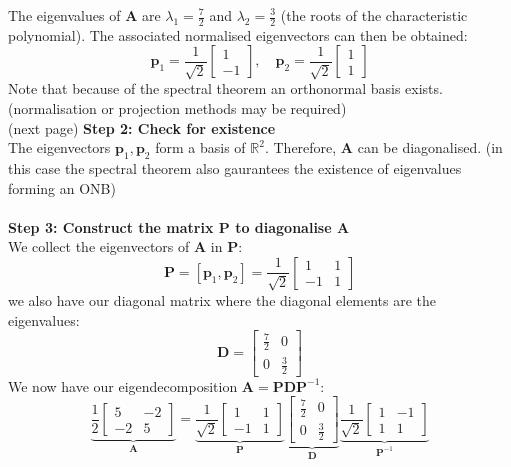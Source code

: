 \documentclass{report}
\begin{document}
The eigenvalues of $\bm{A}$ are $\lambda_1=\frac{7}{2}$ and $\lambda_2=\frac{3}{2}$ (the roots of the characteristic
polynomial). The associated normalised eigenvectors can then be obtained:
\begin{equation*}
\bm{p}_1=\frac{1}{\sqrt{2}}\begin{bmatrix}1\\-1\end{bmatrix},\quad
\bm{p}_2=\frac{1}{\sqrt{2}}\begin{bmatrix}1\\1\end{bmatrix}
\end{equation*}
Note that because of the spectral theorem an orthonormal basis exists. (normalisation or projection methods
may be required)\\
(next page)
\newpage
\noindent\textbf{Step 2: Check for existence}\\
The eigenvectors $\bm{p}_1,\bm{p}_2$ form a basis of 
$\mathbb{R}^2$. Therefore, $\bm{A}$ can be diagonalised.
(in this case the spectral theorem also gaurantees the existence of eigenvalues forming an ONB)\\
\vspace{1mm}\\
\textbf{Step 3: Construct the matrix $\bm{P}$ to diagonalise $\bm{A}$}\\
We collect the eigenvectors of $\bm{A}$ in $\bm{P}$:
\begin{equation*}
\bm{P}=[\bm{p}_1,\bm{p}_2]=\frac{1}{\sqrt{2}}
\begin{bmatrix}
1&1\\-1&1\end{bmatrix}
\end{equation*}
we also have our diagonal matrix where the diagonal elements are the eigenvalues:
\begin{equation*}
\bm{D}=\begin{bmatrix}
\frac{7}{2}&0\\0&\frac{3}{2}\end{bmatrix}
\end{equation*}
We now have our eigendecomposition $\bm{A}=\bm{PDP}^{-1}$:
\begin{equation*}
\underbrace{\frac{1}{2}\begin{bmatrix}5&-2\\-2&5\end{bmatrix}}_{\bm{A}}
=\underbrace{\frac{1}{\sqrt{2}}\begin{bmatrix}1&1\\-1&1\end{bmatrix}}_{\bm{P}}
\underbrace{\begin{bmatrix}\frac{7}{2}&0\\0&\frac{3}{2}\end{bmatrix}}_{\bm{D}}
\underbrace{\frac{1}{\sqrt{2}}\begin{bmatrix}1&-1\\1&1\end{bmatrix}}_{\bm{P}^{-1}}
\end{equation*}
\end{document}
